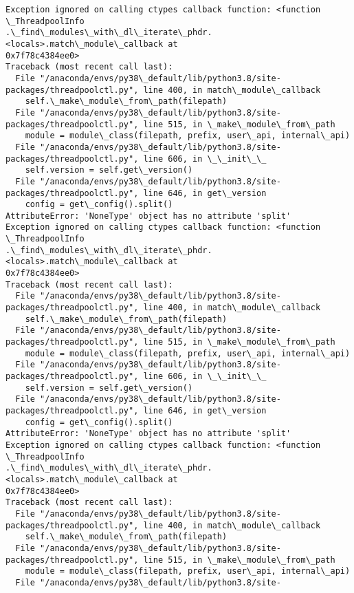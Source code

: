 \documentclass[11pt]{article}
\begin{document}
    \begin{Verbatim}[commandchars=\\\{\}]
Exception ignored on calling ctypes callback function: <function \_ThreadpoolInfo
.\_find\_modules\_with\_dl\_iterate\_phdr.<locals>.match\_module\_callback at
0x7f78c4384ee0>
Traceback (most recent call last):
  File "/anaconda/envs/py38\_default/lib/python3.8/site-
packages/threadpoolctl.py", line 400, in match\_module\_callback
    self.\_make\_module\_from\_path(filepath)
  File "/anaconda/envs/py38\_default/lib/python3.8/site-
packages/threadpoolctl.py", line 515, in \_make\_module\_from\_path
    module = module\_class(filepath, prefix, user\_api, internal\_api)
  File "/anaconda/envs/py38\_default/lib/python3.8/site-
packages/threadpoolctl.py", line 606, in \_\_init\_\_
    self.version = self.get\_version()
  File "/anaconda/envs/py38\_default/lib/python3.8/site-
packages/threadpoolctl.py", line 646, in get\_version
    config = get\_config().split()
AttributeError: 'NoneType' object has no attribute 'split'
Exception ignored on calling ctypes callback function: <function \_ThreadpoolInfo
.\_find\_modules\_with\_dl\_iterate\_phdr.<locals>.match\_module\_callback at
0x7f78c4384ee0>
Traceback (most recent call last):
  File "/anaconda/envs/py38\_default/lib/python3.8/site-
packages/threadpoolctl.py", line 400, in match\_module\_callback
    self.\_make\_module\_from\_path(filepath)
  File "/anaconda/envs/py38\_default/lib/python3.8/site-
packages/threadpoolctl.py", line 515, in \_make\_module\_from\_path
    module = module\_class(filepath, prefix, user\_api, internal\_api)
  File "/anaconda/envs/py38\_default/lib/python3.8/site-
packages/threadpoolctl.py", line 606, in \_\_init\_\_
    self.version = self.get\_version()
  File "/anaconda/envs/py38\_default/lib/python3.8/site-
packages/threadpoolctl.py", line 646, in get\_version
    config = get\_config().split()
AttributeError: 'NoneType' object has no attribute 'split'
Exception ignored on calling ctypes callback function: <function \_ThreadpoolInfo
.\_find\_modules\_with\_dl\_iterate\_phdr.<locals>.match\_module\_callback at
0x7f78c4384ee0>
Traceback (most recent call last):
  File "/anaconda/envs/py38\_default/lib/python3.8/site-
packages/threadpoolctl.py", line 400, in match\_module\_callback
    self.\_make\_module\_from\_path(filepath)
  File "/anaconda/envs/py38\_default/lib/python3.8/site-
packages/threadpoolctl.py", line 515, in \_make\_module\_from\_path
    module = module\_class(filepath, prefix, user\_api, internal\_api)
  File "/anaconda/envs/py38\_default/lib/python3.8/site-

\end{Verbatim}
\end{document}
